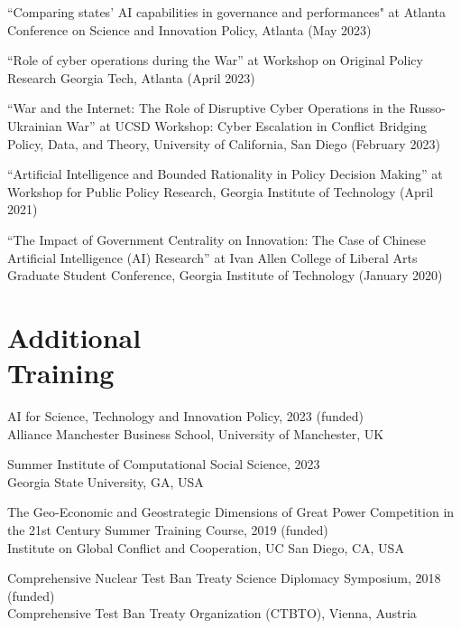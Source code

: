 \documentclass[margin,line, 10pt]{res}
\begin{document}
\begin{resume}
“Comparing states’ AI capabilities in governance and performances" at Atlanta Conference on Science and Innovation Policy, Atlanta (May 2023)
\vspace{-.1cm}

“Role of cyber operations during the War” at Workshop on Original Policy Research Georgia Tech, Atlanta (April 2023)
\vspace{-.1cm}

“War and the Internet: The Role of Disruptive Cyber Operations in the Russo-Ukrainian War” at UCSD Workshop: Cyber Escalation in Conflict Bridging Policy, Data, and Theory, University of California, San Diego (February 2023)
\vspace{-.1cm}

“Artificial Intelligence and Bounded Rationality in Policy Decision Making” at Workshop for Public Policy Research, Georgia Institute of Technology (April 2021)
\vspace{-.1cm}

“The Impact of Government Centrality on Innovation: The Case of Chinese Artificial Intelligence (AI) Research” at Ivan Allen College of Liberal Arts Graduate Student Conference, Georgia Institute of Technology (January 2020)
\vspace{-.1cm}


\section{\sc Additional\\Training}
AI for Science, Technology and Innovation Policy, 2023 (funded)\\
Alliance Manchester Business School, University of Manchester, UK

Summer Institute of Computational Social Science, 2023\\
Georgia State University, GA, USA

The Geo-Economic and Geostrategic Dimensions of Great Power Competition in the 21st 
Century Summer Training Course, 2019 (funded)\\
Institute on Global Conflict and Cooperation, UC San Diego, CA, USA

Comprehensive Nuclear Test Ban Treaty Science Diplomacy Symposium, 2018 (funded)\\
Comprehensive Test Ban Treaty Organization (CTBTO), Vienna, Austria\\




\end{resume}
\end{document}
